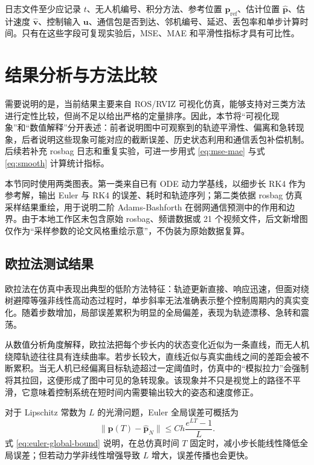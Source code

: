 \documentclass[UTF8,zihao=-4]{ctexart}
\begin{document}
日志文件至少应记录 $t$、无人机编号、积分方法、参考位置 $\bm p_{\mathrm{ref}}$、估计位置 $\hat{\bm p}$、估计速度 $\hat{\bm v}$、控制输入 $\bm u$、通信包是否到达、邻机编号、延迟、丢包率和单步计算时间。只有在这些字段可复现实验后，MSE、MAE 和平滑性指标才具有可比性。

\section{结果分析与方法比较}

需要说明的是，当前结果主要来自 ROS/RVIZ 可视化仿真，能够支持对三类方法进行定性比较，但尚不足以给出严格的定量排序。因此，本节将“可视化现象”和“数值解释”分开表述：前者说明图中可观察到的轨迹平滑性、偏离和急转现象，后者说明这些现象可能对应的截断误差、历史状态利用和通信丢包补偿机制。后续若补充 rosbag 日志和重复实验，可进一步用式 \eqref{eq:mse-mae} 与式 \eqref{eq:smooth} 计算统计指标。

本节同时使用两类图表。第一类来自已有 ODE 动力学基线，以细步长 RK4 作为参考解，输出 Euler 与 RK4 的误差、耗时和轨迹序列；第二类依据 rosbag 仿真采样结果重绘，用于说明二阶 Adams-Bashforth 在弱网通信预测中的作用和边界。由于本地工作区未包含原始 rosbag、频谱数据或 21 个视频文件，后文新增图仅作为“采样参数的论文风格重绘示意”，不伪装为原始数据复算。

\subsection{欧拉法测试结果}
欧拉法在仿真中表现出典型的低阶方法特征：轨迹更新直接、响应迅速，但面对绕树避障等强非线性高动态过程时，单步斜率无法准确表示整个控制周期内的真实变化。随着步数增加，局部误差累积为明显的全局偏差，表现为轨迹漂移、急转和震荡。

从数值分析角度解释，欧拉法把每个步长内的状态变化近似为一条直线，而无人机绕障轨迹往往具有连续曲率。若步长较大，直线近似与真实曲线之间的差距会被不断累积。当无人机已经偏离目标轨迹超过一定阈值时，仿真中的“模拟拉力”会强制将其拉回，这便形成了图中可见的急转现象。该现象并不只是视觉上的路径不平滑，它意味着控制系统在短时间内需要输出较大的姿态和速度修正。

对于 Lipschitz 常数为 $L$ 的光滑问题，Euler 全局误差可概括为
\begin{equation}
  \|\bm p(T)-\hat{\bm p}_N\|\leq C h\frac{e^{LT}-1}{L}.
  \label{eq:euler-global-bound}
\end{equation}
式 \eqref{eq:euler-global-bound} 说明，在总仿真时间 $T$ 固定时，减小步长能线性降低全局误差；但若动力学非线性增强导致 $L$ 增大，误差传播也会更快。
\end{document}
